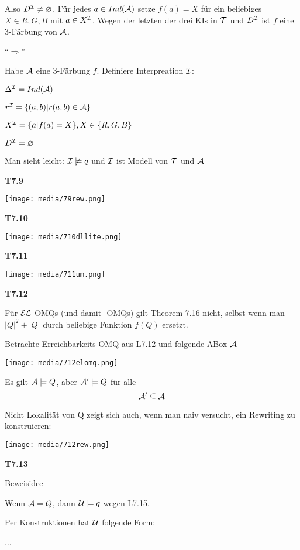 Also $D^{\mathcal{I}} \neq \varnothing$. Für jedes $a \in Ind(\mathcal{A})$ setze $f(a) = X$ für ein beliebiges $X \in{R,G,B}$ mit $a \in X^{\mathcal{I}}$. Wegen der letzten der drei KIs in $\mathcal{T}$ und $D^{\mathcal{I}}$ ist $f$ eine 3-Färbung von $\mathcal{A}$.

"`$\Rightarrow$"'

Habe $\mathcal{A}$ eine 3-Färbung $f$. Definiere Interpreation $\mathcal{I}$:

$\Delta^{\mathcal{I}} = Ind(\mathcal{A})$

$r^{\mathcal{I}} = \{(a,b) | r(a,b) \in \mathcal{A} \}$

$X^{\mathcal{I}} = \{a | f(a) = X\}, X \in \{R,G,B\}$

$D^{\mathcal{I}} = \varnothing$

Man sieht leicht: $\mathcal{I} \not\models q$ und $\mathcal{I}$ ist Modell von $\mathcal{T}$ und $\mathcal{A}$

\textbf{T7.9}

\texttt{[image: media/79rew.png]}

\textbf{T7.10}

\texttt{[image: media/710dllite.png]}

\textbf{T7.11}

\texttt{[image: media/711um.png]}

\textbf{T7.12}

Für $\mathcal{E}\mathcal{L}$-OMQs (und damit \ALC-OMQs) gilt Theorem 7.16 nicht, selbst wenn man $|Q|^2 + |Q|$ durch beliebige Funktion $f(Q)$ ersetzt. 

Betrachte Erreichbarkeits-OMQ aus L7.12 und folgende ABox $\mathcal{A}$

\texttt{[image: media/712elomq.png]}

Es gilt $\mathcal{A} \models Q$, aber $\mathcal{A}' \models Q$ für alle $$\mathcal{A}' \subseteq \mathcal{A}$$

Nicht Lokalität von Q zeigt sich auch, wenn man naiv versucht, ein Rewriting zu konstruieren:

\texttt{[image: media/712rew.png]}

\textbf{T7.13}

Beweisidee

Wenn $\mathcal{A} = Q$, dann $\mathcal{U} \models q$ wegen L7.15.

Per Konstruktionen hat $\mathcal{U}$ folgende Form:

...
